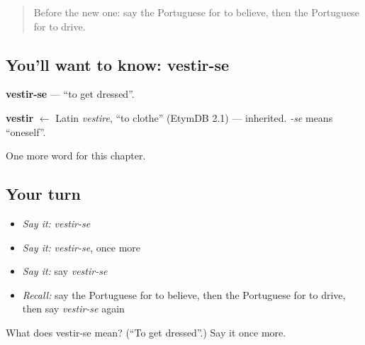 \begin{quote}
Before the new one: say the Portuguese for to believe, then the Portuguese for to drive.
\end{quote}

\subsection*{You'll want to know: vestir-se}
\textbf{vestir-se} — \textquotedblleft{}to get dressed\textquotedblright{}.

\begin{cousinweb}
\textbf{vestir} $\leftarrow$ Latin \emph{vestire}, \textquotedblleft{}to clothe\textquotedblright{} (EtymDB 2.1) — inherited. \emph{-se} means \textquotedblleft{}oneself\textquotedblright{}.
\end{cousinweb}

\begin{grammarlens}[title={What you've built}]
One more word for this chapter.
\end{grammarlens}

\subsection*{Your turn}
\begin{itemize}
\raggedright
  \item \emph{Say it:} \emph{vestir-se}
  \item \emph{Say it:} \emph{vestir-se}, once more
  \item \emph{Say it:} say \emph{vestir-se}
  \item \emph{Recall:} say the Portuguese for to believe, then the Portuguese for to drive, then say \emph{vestir-se} again
\end{itemize}

\begin{tcolorbox}[breakable,colback=teal!4,colframe=teal!35!black,title={Before you move on}]
What does vestir-se mean? (\textquotedblleft{}To get dressed\textquotedblright{}.) Say it once more.
\end{tcolorbox}
